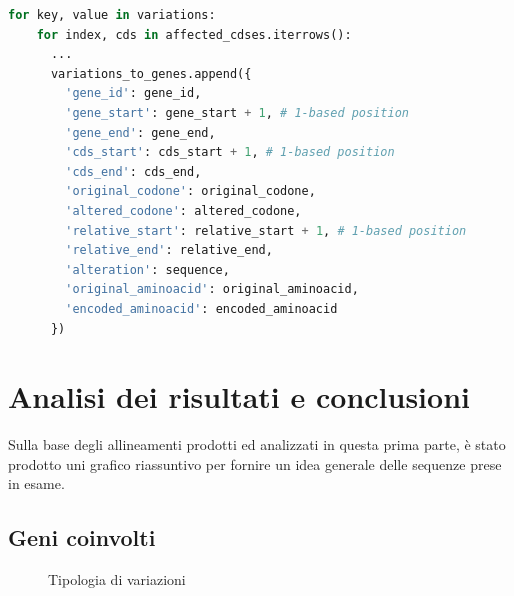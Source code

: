 \documentclass[11pt,italian]{article}
\begin{document}
\newpage
\begin{lstlisting}[language=Python,caption=Memorizzazione dei risultati nella struttura dati a lista,label=code:variation_loop]
  for key, value in variations:
    for index, cds in affected_cdses.iterrows():
      ...
      variations_to_genes.append({
        'gene_id': gene_id,
        'gene_start': gene_start + 1, # 1-based position
        'gene_end': gene_end,
        'cds_start': cds_start + 1, # 1-based position
        'cds_end': cds_end,
        'original_codone': original_codone,
        'altered_codone': altered_codone,
        'relative_start': relative_start + 1, # 1-based position
        'relative_end': relative_end,
        'alteration': sequence,
        'original_aminoacid': original_aminoacid,
        'encoded_aminoacid': encoded_aminoacid
      })
\end{lstlisting}

\section{Analisi dei risultati e conclusioni}
Sulla base degli allineamenti prodotti ed analizzati in questa prima parte, è stato prodotto uni grafico riassuntivo per fornire un idea generale delle sequenze prese in esame.

\subsection{Geni coinvolti}
\begin{figure}[H]
  \caption{Tipologia di variazioni}
  \label{fig:jalview-inner}
\end{figure}
\end{document}
